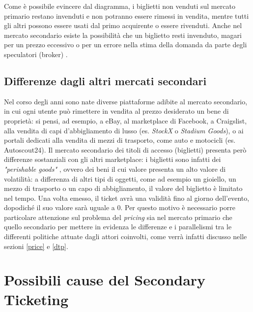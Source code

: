 Come è possibile evincere dal diagramma, i biglietti non venduti sul mercato primario restano invenduti e non potranno essere rimessi in vendita, mentre tutti gli altri possono essere usati dal primo acquirente o essere rivenduti. Anche nel mercato secondario esiste la possibilità che un biglietto resti invenduto, magari per un prezzo eccessivo o per un errore nella stima della domanda da parte degli speculatori (broker) \cite{connolly2006rockonomics}.
\subsection{Differenze dagli altri mercati secondari}
Nel corso degli anni sono nate diverse piattaforme adibite al mercato secondario, in cui ogni utente può rimettere in vendita al prezzo desiderato un bene di proprietà: si pensi, ad esempio, a eBay, al marketplace di Facebook, a Craigslist, alla vendita di capi d'abbigliamento di lusso (es. \textit{StockX} o \textit{Stadium Goods}), o ai portali dedicati alla vendita di mezzi di trasporto, come auto e motocicli (es. Autoscout24).
Il mercato secondario dei titoli di accesso (biglietti) presenta però differenze sostanziali con gli altri marketplace: i biglietti sono infatti dei \textit{"perishable goods"} \cite{connolly2006rockonomics}, ovvero dei beni il cui valore presenta un alto valore di volatilità: a differenza di altri tipi di oggetti, come ad esempio un gioiello, un mezzo di trasporto o un capo di abbigliamento, il valore del biglietto è limitato nel tempo. Una volta emesso, il ticket avrà una validità fino al giorno dell'evento, dopodiché il suo valore sarà uguale a 0. Per questo motivo è necessario porre particolare attenzione sul problema del \textit{pricing} sia nel mercato primario che quello secondario per mettere in evidenza le differenze e i parallelismi tra le differenti politiche attuate dagli attori coinvolti, come verrà infatti discusso nelle sezioni \ref{price} e \ref{dtp}. 

\section{Possibili cause del Secondary Ticketing}

